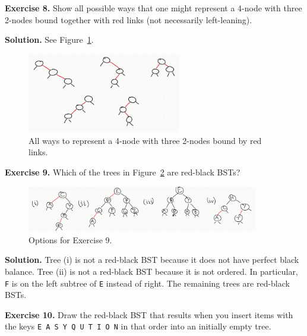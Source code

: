 \documentclass[12pt, a4paper]{article}
\newenvironment{ex}[2][Exercise]
{\par\medskip\noindent \textbf{#1 #2.}}
{\medskip}
\newenvironment{sol}[1][Solution]
{\par\medskip\noindent \textbf{#1.} }
{\medskip}
\begin{document}
	\begin{ex}{8}
		Show all possible ways that one might represent a 4-node with three 2-nodes
		bound together with red links (not necessarily left-leaning).
	\end{ex}
	\begin{sol}
		See Figure~\ref{fig:ex-08}.
		\begin{figure}
			\centering
			\includegraphics[width=0.6\textwidth]{exercise-08}
			\caption{All ways to represent a 4-node with three 2-nodes bound by red links.}
			\label{fig:ex-08}
		\end{figure}
	\end{sol}
	\begin{ex}{9}
		Which of the trees in Figure~\ref{fig:ex-09} are red-black BSTs?
		\begin{figure}
			\centering
			\includegraphics[width=0.9\textwidth]{exercise-09}
			\caption{Options for Exercise 9.}
			\label{fig:ex-09}
		\end{figure}
	\end{ex}
	\begin{sol}
		 Tree (i) is not a red-black BST because it does not have perfect black balance.
		 Tree (ii) is not a red-black BST because it is not ordered. In particular,
		 \texttt{F} is on the left subtree of \texttt{E} instead of right. The remaining
		 trees are red-black BSTs.
	\end{sol}
	\begin{ex}{10}
		Draw the red-black BST that results when you insert items with the keys
		\texttt{E A S Y Q U T I O N} in that order into an initially empty tree.
	\end{ex}
\end{document}
